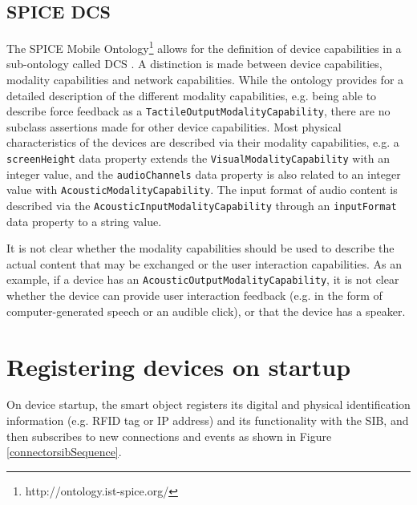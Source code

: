 

\subsection{SPICE DCS}

The SPICE Mobile Ontology\footnote{http://ontology.ist-spice.org/} allows for the definition of device capabilities in a sub-ontology called \ac{DCS} \cite{Villalonga2009}. A distinction is made between device capabilities, modality capabilities and network capabilities. While the ontology provides for a detailed description of the different modality capabilities, e.g. being able to describe force feedback as a \texttt{TactileOutputModalityCapability}, there are no subclass assertions made for other device capabilities. Most physical characteristics of the devices are described via their modality capabilities, e.g. a \texttt{screenHeight} data property extends the \texttt{VisualModalityCapability} with an integer value, and the \texttt{audioChannels} data property is also related to an integer value with \texttt{Acoustic\-Modality\-Capability}. The input format of audio content is described via the \texttt{AcousticInputModalityCapability} through an \texttt{inputFormat} data property to a string value.

It is not clear whether the modality capabilities should be used to describe the actual content that may be exchanged or the user interaction capabilities. As an example, if a device has an \texttt{AcousticOutputModalityCapability}, it is not clear whether the device can provide user interaction feedback (e.g. in the form of computer-generated speech or an audible click), or that the device has a speaker.




\section{Registering devices on startup}

On device startup, the smart object registers its digital and physical identification information (e.g. RFID tag or IP address) and its functionality with the SIB, and then subscribes to new connections and events as shown in Figure \ref{connectorsibSequence}.

